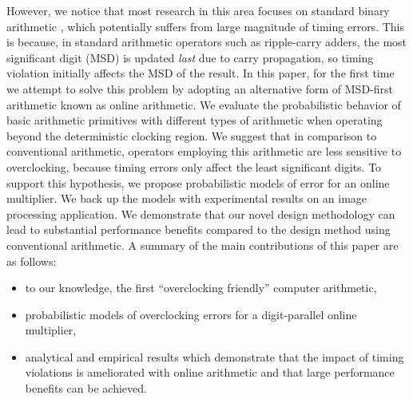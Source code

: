 \documentclass{acm_proc_article-sp}
\begin{document}
However, we notice that most research in this area focuses on standard binary arithmetic \cite{Gupta2013TransCADICS,NonUniformScaling,Undersigned2x2multiplier}, which potentially suffers from large magnitude of timing errors. This is because, in standard arithmetic operators such as ripple-carry adders, the most significant digit (MSD) is updated \emph{last} due to carry propagation, so timing violation initially affects the MSD of the result. In this paper, for the first time we attempt to solve this problem by adopting an alternative form of MSD-first arithmetic known as online arithmetic. We evaluate the probabilistic behavior of basic arithmetic primitives with different types of arithmetic when operating beyond the deterministic clocking region. We suggest that in comparison to conventional arithmetic, operators employing this arithmetic are less sensitive to overclocking, because timing errors only affect the least significant digits. To support this hypothesis, we propose probabilistic models of error for an online multiplier. We back up the models with experimental results on an image processing application. We demonstrate that our novel design methodology can lead to substantial performance benefits compared to the design method using conventional arithmetic. A summary of the main contributions of this paper are as follows:
%
\begin{itemize}
\vspace{-2ex}
  \item to our knowledge, the first ``overclocking friendly'' computer arithmetic,\vspace{-.7ex}
  \item probabilistic models of overclocking errors for a digit-parallel online multiplier,\vspace{-.7ex}
  \item analytical and empirical results which demonstrate that the impact of timing violations is ameliorated with online arithmetic and that large performance benefits can be achieved.\vspace{-.7ex}
\end{itemize}



\end{document}
